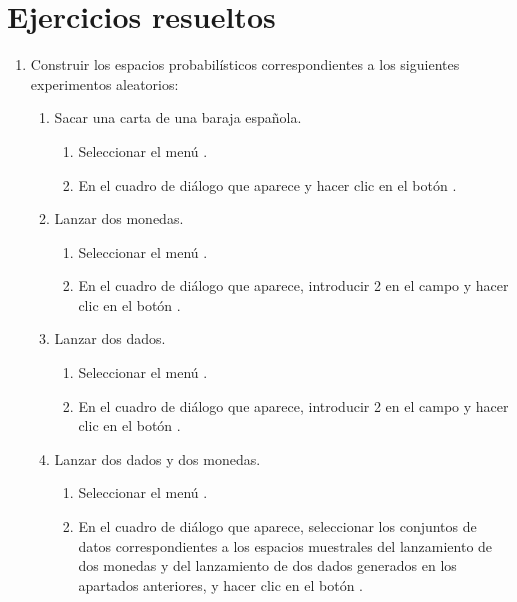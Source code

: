 
\section{Ejercicios resueltos}
\begin{enumerate}[leftmargin=*] 
\item Construir los espacios probabilísticos correspondientes a los siguientes experimentos aleatorios:
\begin{enumerate}
\item Sacar una carta de una baraja española.
\begin{indicacion}
\begin{enumerate}
\item Seleccionar el menú .
\item En el cuadro de diálogo que aparece y hacer clic en el botón . 
\end{enumerate}
\end{indicacion}
\item Lanzar dos monedas.
\begin{indicacion}
\begin{enumerate}
\item Seleccionar el menú .
\item En el cuadro de diálogo que aparece, introducir 2 en el campo  y hacer clic en el botón .
\end{enumerate}
\end{indicacion}

\item Lanzar dos dados.
\begin{indicacion}
\begin{enumerate}
\item Seleccionar el menú .
\item En el cuadro de diálogo que aparece, introducir 2 en el campo  y hacer clic en el botón .
\end{enumerate}
\end{indicacion}

\item Lanzar dos dados y dos monedas. 
\begin{indicacion}
\begin{enumerate}
\item Seleccionar el menú .
\item En el cuadro de diálogo que aparece, seleccionar los conjuntos de datos correspondientes a los espacios muestrales del lanzamiento de
dos monedas y del lanzamiento de dos dados generados en los apartados anteriores, y hacer clic en el botón .
\end{enumerate}
\end{indicacion}
\end{enumerate}  


\end{enumerate}

